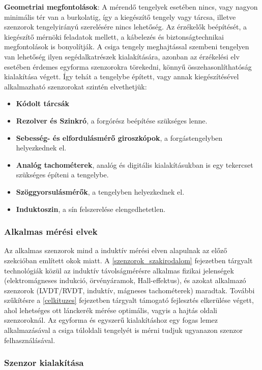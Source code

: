 \textbf{Geometriai megfontolások}: A mérendő tengelyek esetében nincs, vagy nagyon minimális tér van a burkolatig, így a kiegészítő tengely vagy tárcsa, illetve szenzorok tengelyirányú szerelésére nincs lehetőség. Az érzékelők beépítését, a kiegészítő mérnöki feladatok mellett, a kábelezés és biztonságtechnikai megfontolások is bonyolítják. A csiga tengely meghajtással szembeni tengelyen van lehetőség ilyen segédalkatrészek kialakítására, azonban az érzékelési elv esetében érdemes egyforma szenzorokra törekedni, könnyű összehasonlíthatóság kialakítása végett. Így tehát a tengelybe épített, vagy annak kiegészítésével alkalmazható szenzorokat szintén elvethetjük:
\begin{itemize}
	\item \textbf{Kódolt tárcsák}
	\item \textbf{Rezolver és Szinkró}, a forgórész beépítése szükséges lenne.
	\item \textbf{Sebesség- és elfordulásmérő giroszkópok}, a forgástengelyben helyezkednek el.
	\item \textbf{Analóg tachométerek}, analóg és digitális kialakításukban is egy tekercset szükséges építeni a tengelybe.
	\item \textbf{Szöggyorsulásmérők}, a tengelyben helyezkednek el.
	\item \textbf{Induktoszin}, a sín felszerelése elengedhetetlen.
\end{itemize}

\subsubsection{Alkalmas mérési elvek}

Az alkalmas szenzorok mind a induktív mérési elven alapulnak az előző szekcióban említett okok miatt. A \ref{szenzorok_szakirodalom} fejezetben tárgyalt technológiák közül az induktív távolságmérésre alkalmas fizikai jelenségek (elektromágneses indukció, örvényáramok, Hall-effektus), és azokat alkalmazó szenzorok (LVDT/RVDT, induktív, mágneses tachométerek) maradtak. További szűkítésre a \ref{celkituzes} fejezetben tárgyalt támogató fejlesztés elkerülése végett, ahol lehetséges ott lánckerék mérése optimális, vagyis a hajtás oldali szenzoroknál. Az egyforma és egyszerű kialakításhoz egy fogas lemez alkalmazásával a csiga túloldali tengelyét is mérni tudjuk ugyanazon szenzor felhasználásával. 

\subsubsection{Szenzor kialakítása}

